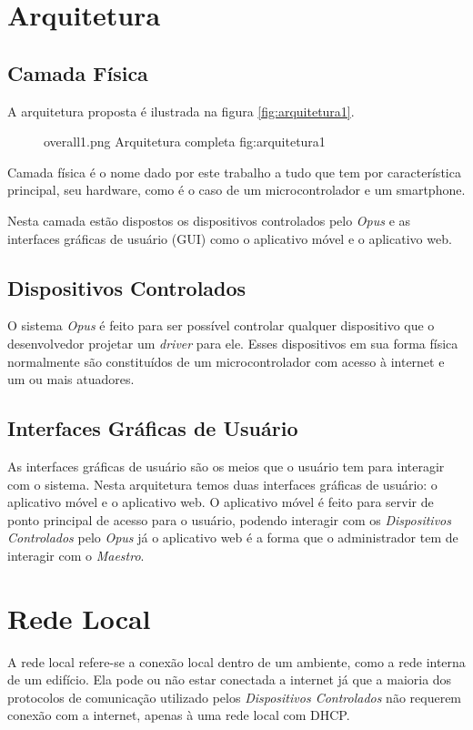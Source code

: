 \section{Arquitetura}
\subsection{Camada Física}

A arquitetura proposta é ilustrada na figura \ref{fig:arquitetura1}.
\begin{figure}[h!]
    {overall1.png}
    {Arquitetura completa}
    {fig:arquitetura1}
\end{figure}

\label{arq-subsec:camada-fisica}
Camada física é o nome dado por este trabalho a tudo que tem por característica
principal, seu hardware, como é o caso de um microcontrolador e um smartphone.

Nesta camada estão dispostos os dispositivos controlados pelo \emph{Opus} e as interfaces
gráficas de usuário (GUI) como o aplicativo móvel e o aplicativo web.

\subsection{Dispositivos Controlados}
\label{arq-subsubsec:dispositivos-controlados}
O sistema \emph{Opus} é feito para ser possível controlar qualquer dispositivo que o desenvolvedor
projetar um \emph{driver} para ele. Esses dispositivos em sua forma física normalmente
são constituídos de um microcontrolador com acesso à internet e um ou mais atuadores.

\subsection{Interfaces Gráficas de Usuário}
\label{arq-subsubsec:interfaces-graficas-usuario}
As interfaces gráficas de usuário são os meios que o usuário tem para interagir com o sistema.
Nesta arquitetura temos duas interfaces gráficas de usuário: o aplicativo móvel e o aplicativo web.
O aplicativo móvel é feito para servir de ponto principal de acesso para o usuário, podendo interagir com
os \emph{Dispositivos Controlados} pelo \emph{Opus} já o aplicativo web é a forma que o administrador
tem de interagir com o \emph{Maestro}.


\section{Rede Local}
\label{arq-subsec:rede-local}
A rede local refere-se a conexão local dentro de um ambiente, como a rede interna de um edifício. Ela pode ou não
estar conectada a internet já que a maioria dos protocolos de comunicação utilizado pelos
\emph{Dispositivos Controlados} não requerem conexão com a internet, apenas à uma rede local com DHCP.

